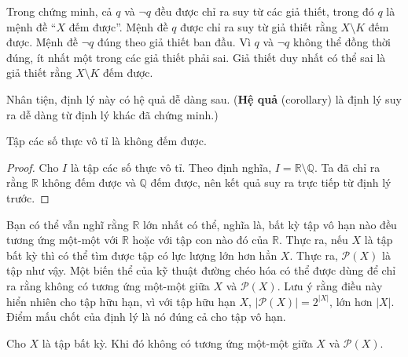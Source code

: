 Trong chứng minh, cả $q$ và $\neg q$ đều được chỉ ra suy từ các giả thiết, trong đó $q$ là mệnh đề ``$X$ đếm được''. Mệnh đề $q$ được chỉ ra suy từ giả thiết rằng $X \setminus K$ đếm được. Mệnh đề $\neg q$ đúng theo giả thiết ban đầu. Vì $q$ và $\neg q$ không thể đồng thời đúng, ít nhất một trong các giả thiết phải sai. Giả thiết duy nhất có thể sai là giả thiết rằng $X \setminus K$ đếm được.

Nhân tiện, định lý này có hệ quả dễ dàng sau. (\textbf{Hệ quả} (corollary) là định lý suy ra dễ dàng từ định lý khác đã chứng minh.)

\begin{corollary}
Tập các số thực vô tỉ là không đếm được.
\end{corollary}

\begin{proof}
Cho $I$ là tập các số thực vô tỉ. Theo định nghĩa, $I = \mathbb{R} \setminus \mathbb{Q}$. Ta đã chỉ ra rằng $\mathbb{R}$ không đếm được và $\mathbb{Q}$ đếm được, nên kết quả suy ra trực tiếp từ định lý trước.
\end{proof}

Bạn có thể vẫn nghĩ rằng $\mathbb{R}$ lớn nhất có thể, nghĩa là, bất kỳ tập vô hạn nào đều tương ứng một-một với $\mathbb{R}$ hoặc với tập con nào đó của $\mathbb{R}$. Thực ra, nếu $X$ là tập bất kỳ thì có thể tìm được tập có lực lượng lớn hơn hẳn $X$. Thực ra, $\mathcal{P}(X)$ là tập như vậy. Một biến thể của kỹ thuật đường chéo hóa có thể được dùng để chỉ ra rằng không có tương ứng một-một giữa $X$ và $\mathcal{P}(X)$. Lưu ý rằng điều này hiển nhiên cho tập hữu hạn, vì với tập hữu hạn $X$, $|\mathcal{P}(X)| = 2^{|X|}$, lớn hơn $|X|$. Điểm mấu chốt của định lý là nó đúng cả cho tập vô hạn.

\begin{theorem}
Cho $X$ là tập bất kỳ. Khi đó không có tương ứng một-một giữa $X$ và $\mathcal{P}(X)$.
\end{theorem}

